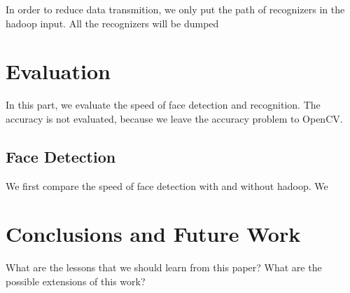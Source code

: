 \documentclass[11pt, draftclsnofoot, onecolumn]{IEEEtran}
\begin{document}
In order to reduce data transmition, we only put the path of recognizers in the hadoop input. All the recognizers will be dumped 

\section{Evaluation} \label{sec:evaluation}

In this part, we evaluate the speed of face detection and recognition. The accuracy is not evaluated, because we leave the accuracy problem to OpenCV.

\subsection{Face Detection}
We first compare the speed of face detection with and without hadoop. We

\section{Conclusions and Future Work} \label{sec:conclusion}

What are the lessons that we should learn from this paper? 
What are the possible extensions of this work?


   
\end{document}
